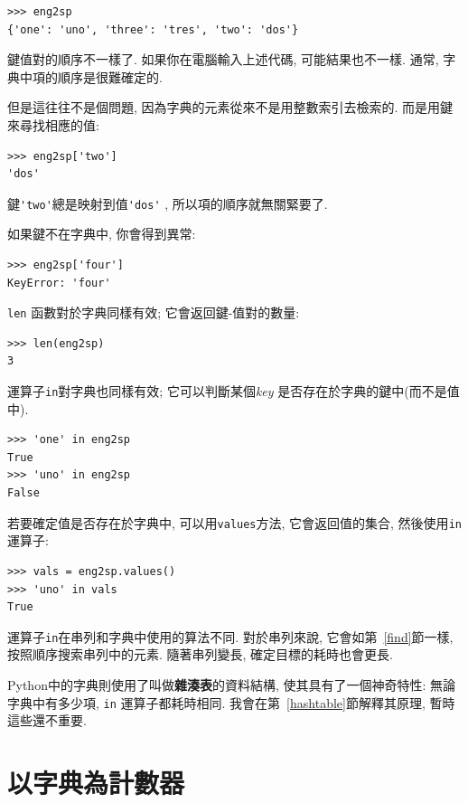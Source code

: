 \documentclass[10pt]{book}
\begin{document}
\begin{verbatim}
>>> eng2sp
{'one': 'uno', 'three': 'tres', 'two': 'dos'}
\end{verbatim}
%
鍵值對的順序不一樣了. 
如果你在電腦輸入上述代碼, 可能結果也不一樣. 
通常, 字典中項的順序是很難確定的. 

但是這往往不是個問題, 因為字典的元素從來不是用整數索引去檢索的. 
而是用鍵來尋找相應的值:

\begin{verbatim}
>>> eng2sp['two']
'dos'
\end{verbatim}
%
鍵\verb"'two'"總是映射到值\verb"'dos'" , 所以項的順序就無關緊要了. 

如果鍵不在字典中, 你會得到異常:

\begin{verbatim}
>>> eng2sp['four']
KeyError: 'four'
\end{verbatim}
%
 {\tt len} 函數對於字典同樣有效; 它會返回鍵-值對的數量:

\begin{verbatim}
>>> len(eng2sp)
3
\end{verbatim}
%
運算子{\tt in}對字典也同樣有效;
它可以判斷某個{\em key} 是否存在於字典的鍵中(而不是值中). 

\begin{verbatim}
>>> 'one' in eng2sp
True
>>> 'uno' in eng2sp
False
\end{verbatim}
%
若要確定值是否存在於字典中, 可以用{\tt values}方法, 它會返回值的集合,  
然後使用{\tt in}運算子:

\begin{verbatim}
>>> vals = eng2sp.values()
>>> 'uno' in vals
True
\end{verbatim}
%
運算子{\tt in}在串列和字典中使用的算法不同. 
對於串列來說, 它會如第~\ref{find}節一樣, 按照順序搜索串列中的元素. 
隨著串列變長, 確定目標的耗時也會更長. 

Python中的字典則使用了叫做{\bf 雜湊表}的資料結構, 使其具有了一個神奇特性: 
無論字典中有多少項, {\tt in} 運算子都耗時相同. 
我會在第~\ref{hashtable}節解釋其原理, 暫時這些還不重要. 

\section{以字典為計數器}
\label{histogram}
\end{document}

